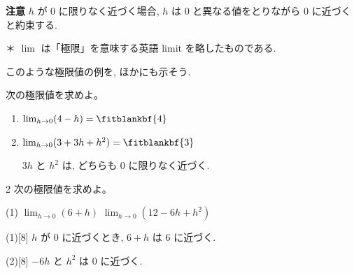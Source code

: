 \documentclass[14pt,dvipdfmx]{jsarticle}
\begin{document}
\vspace{0.1em}
\textbf{注意}\quad
$h$ が $0$ に限りなく近づく場合, $h$ は $0$ と異なる値をとりながら
$0$ に近づくと約束する.
\par\vspace{0.35em}
{\footnotesize ＊ $\lim$ は「極限」を意味する英語 limit を略したものである.}

\vspace{0.7em}
このような極限値の例を, ほかにも示そう.
\par\vspace{1em}
\quad 次の極限値を求めよ。
\begin{enumerate}[label=\textbf{(\arabic*)}, leftmargin=2.4zw, itemsep=0.4em]
  \item $\lim_{h \to 0}(4-h)=\fitblankbf{4}$
        \par\vspace{0.5em}
  \item $\lim_{h \to 0}(3+3h+h^{2})=\fitblankbf{3}$
        \par\vspace{0.5em}
        {\normalsize $3h$ と $h^{2}$ は, どちらも $0$ に限りなく近づく.}
\end{enumerate}

\vfill
\nextpage

\vspace{-1.4zw}%
\begin{practiceprob}{2}
  次の極限値を求めよ。
  \begin{tasks}[label=(\arabic*), label-width=1.6zw, item-indent=2zw, after-item-skip=0.2em](1)
    \task $\displaystyle\lim_{h \to 0}(6+h)$
    \task $\displaystyle\lim_{h \to 0}(12-6h+h^{2})$
  \end{tasks}
\end{practiceprob}

\vspace{-0.15em}
\begin{answerbox}{(1)}[8]
  $h$ が $0$ に近づくとき, $6+h$ は $6$ に近づく.
\end{answerbox}
\begin{answerbox}{(2)}[8]
  $-6h$ と $h^{2}$ は $0$ に近づく.
\end{answerbox}
\end{document}
